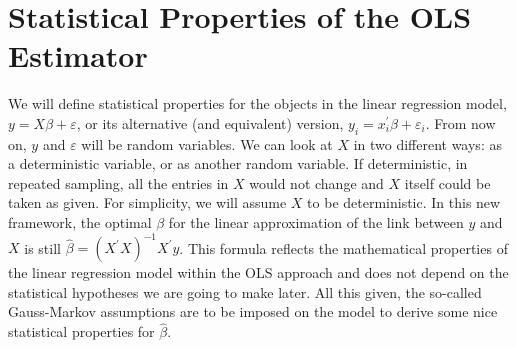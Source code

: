 \section{Statistical Properties of the OLS Estimator}
We will define statistical properties for the objects in the linear regression model, $y=X \beta+\varepsilon$, or its alternative (and equivalent) version, $y_{i}=x_{i}^{\prime} \beta+\varepsilon_{i}$. From now on, $y$ and $\varepsilon$ will be random variables. We can look at $X$ in two different ways: as a deterministic variable, or as another random variable. If deterministic, in repeated sampling, all the entries in $X$ would not change and $X$ itself could be taken as given. For simplicity, we will assume $X$ to be deterministic. In this new framework, the optimal $\beta$ for the linear approximation of the link between $y$ and $X$ is still $\widehat{\beta}=\left(X^{\prime} X\right)^{-1} X^{\prime} y$. This formula reflects the mathematical properties of the linear regression model within the OLS approach and does not depend on the statistical hypotheses we are going to make later. All this given, the so-called Gauss-Markov assumptions are to be imposed on the model to derive some nice statistical properties for $\widehat{\beta}$.

